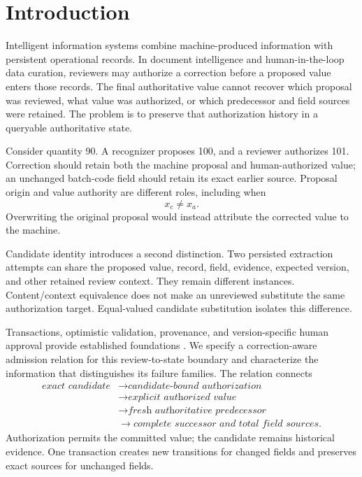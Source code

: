 \section{Introduction}
\label{sec:introduction}

Intelligent information systems combine machine-produced information with persistent operational records. In document intelligence and human-in-the-loop data curation, reviewers may authorize a correction before a proposed value enters those records. The final authoritative value cannot recover which proposal was reviewed, what value was authorized, or which predecessor and field sources were retained. The problem is to preserve that authorization history in a queryable authoritative state.

Consider quantity 90. A recognizer proposes 100, and a reviewer authorizes 101. Correction should retain both the machine proposal and human-authorized value; an unchanged batch-code field should retain its exact earlier source. Proposal origin and value authority are different roles, including when
\begin{equation}
x_c\neq x_a.
\label{eq:intro-correction}
\end{equation}
Overwriting the original proposal would instead attribute the corrected value to the machine.

Candidate identity introduces a second distinction. Two persisted extraction attempts can share the proposed value, record, field, evidence, expected version, and other retained review context. They remain different instances. Content/context equivalence does not make an unreviewed substitute the same authorization target. Equal-valued candidate substitution isolates this difference.

Transactions, optimistic validation, provenance, and version-specific human approval provide established foundations \citep{gray1981transaction,kung1981occ,moreau2013provdm,mershad2015approval}. We specify a correction-aware admission relation for this review-to-state boundary and characterize the information that distinguishes its failure families. The relation connects
\begin{equation}
\begin{aligned}
\textit{exact candidate}
&\rightarrow\textit{candidate-bound authorization}\\
&\rightarrow\textit{explicit authorized value}\\
&\rightarrow\textit{fresh authoritative predecessor}\\
&\rightarrow\textit{complete successor and total field sources}.
\end{aligned}
\label{eq:admission-chain}
\end{equation}
Authorization permits the committed value; the candidate remains historical evidence. One transaction creates new transitions for changed fields and preserves exact sources for unchanged fields.


